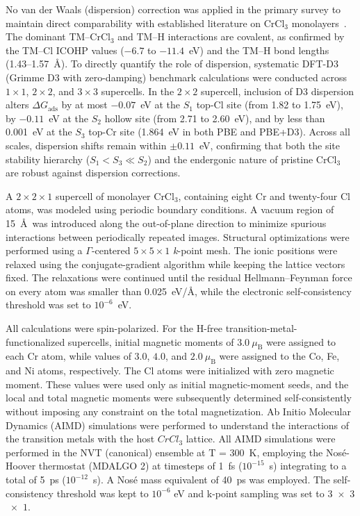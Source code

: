 \documentclass[journal=jacsat,manuscript=article]{achemso}
\begin{document}
{\color{revcolor}%
  No van der Waals (dispersion) correction was applied in the primary survey to maintain direct comparability with established literature on CrCl$_3$ monolayers~\cite{Luo2020,Mastrippolito2022,Zala2024}. The dominant TM--CrCl$_3$ and TM--H interactions are covalent, as confirmed by the TM--Cl ICOHP values ($-6.7$ to $-11.4$~eV) and the TM--H bond lengths (1.43--1.57~\AA). To directly quantify the role of dispersion, systematic DFT-D3 (Grimme D3 with zero-damping) benchmark calculations were conducted across $1\times 1$, $2\times 2$, and $3\times 3$ supercells. In the $2\times 2$ supercell, inclusion of D3 dispersion alters $\Delta G_{\mathrm{ads}}$ by at most $-0.07$~eV at the $S_1$ top-Cl site (from 1.82 to 1.75~eV), by $-0.11$~eV at the $S_2$ hollow site (from 2.71 to 2.60~eV), and by less than 0.001~eV at the $S_3$ top-Cr site (1.864~eV in both PBE and PBE+D3). Across all scales, dispersion shifts remain within $\pm 0.11$~eV, confirming that both the site stability hierarchy ($S_1 < S_3 \ll S_2$) and the endergonic nature of pristine CrCl$_3$ are robust against dispersion corrections.
\par}

A $2 \times 2 \times 1$ supercell of monolayer CrCl$_3$, containing eight Cr and twenty-four Cl atoms, was modeled using periodic boundary conditions. A vacuum region of 15~\AA\ was introduced along the out-of-plane direction to minimize spurious interactions between periodically repeated images. Structural optimizations were performed using a $\Gamma$-centered $5 \times 5 \times 1$ \textit{k}-point mesh. The ionic positions were relaxed using the conjugate-gradient algorithm while keeping the lattice vectors fixed. The relaxations were continued until the residual Hellmann--Feynman force on every atom was smaller than 0.025~eV/\AA, while the electronic self-consistency threshold was set to $10^{-6}$~eV.

All calculations were spin-polarized. For the H-free transition-metal-functionalized supercells, initial magnetic moments of $3.0~\mu_{\mathrm{B}}$ were assigned to each Cr atom, while values of $3.0$, $4.0$, and $2.0~\mu_{\mathrm{B}}$ were assigned to the Co, Fe, and Ni atoms, respectively. The Cl atoms were initialized with zero magnetic moment. These values were used only as initial magnetic-moment seeds, and the local and total magnetic moments were subsequently determined self-consistently without imposing any constraint on the total magnetization.
{\color{revcolor} %
  Ab Initio Molecular Dynamics (AIMD) simulations were performed to understand the interactions of the transition metals with the host $CrCl_3$ lattice. All AIMD simulations were performed in the NVT (canonical) ensemble at T = $300$~K, employing the Nosé-Hoover thermostat (MDALGO 2) \cite{NOSE1, NOSE2, NOSE3} at timesteps of 1~fs ($10^{-15}$~s) integrating to a total of 5~ps ($10^{-12}$~s). A Nosé mass equivalent of 40~ps was employed. The self-consistency threshold was kept to $10^{-6}$ eV and k-point sampling was set to $3$~$\times$~$3$~$\times$~$1$.
}
\end{document}

